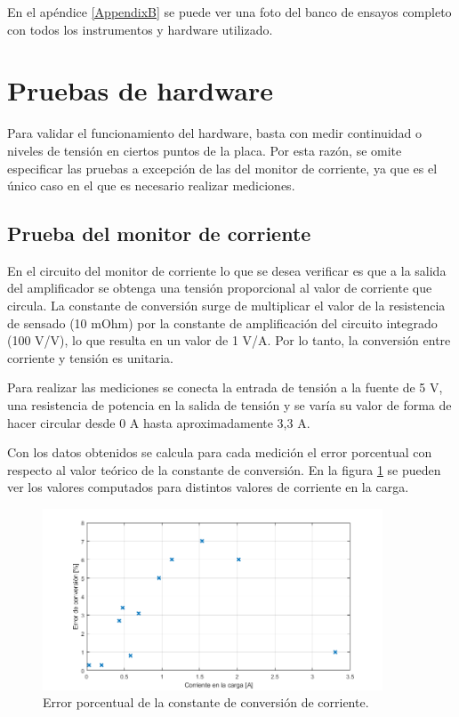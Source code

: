En el apéndice \ref{AppendixB} se puede ver una foto del banco de ensayos completo con todos los instrumentos y hardware utilizado.

\section{Pruebas de hardware}
\label{sec:pruebasHW}

Para validar el funcionamiento del hardware, basta con medir continuidad o niveles de tensión en ciertos puntos de la placa. Por esta razón, se omite especificar las pruebas a excepción de las del monitor de corriente, ya que es el único caso en el que es necesario realizar mediciones.

\subsection{Prueba del monitor de corriente}
\label{sec:monCorr}

En el circuito del monitor de corriente lo que se desea verificar es que a la salida del amplificador se obtenga una tensión proporcional al valor de corriente que circula. La constante de conversión surge de multiplicar el valor de la resistencia de sensado (10 mOhm) por la constante de amplificación del circuito integrado (100 V/V), lo que resulta en un valor de 1 V/A. Por lo tanto, la conversión entre corriente y tensión es unitaria.

Para realizar las mediciones se conecta la entrada de tensión a la fuente de 5 V, una resistencia de potencia en la salida de tensión y se varía su valor de forma de hacer circular desde 0 A hasta aproximadamente 3,3 A.


Con los datos obtenidos se calcula para cada medición el error porcentual con respecto al valor teórico de la constante de conversión. En la figura \ref{fig:testMonCorr} se pueden ver los valores computados para distintos valores de corriente en la carga.

\begin{figure}[H]
\centering
\includegraphics[width=0.9\textwidth]{./Figures/testMonCorr.png}
\caption{Error porcentual de la constante de conversión de corriente.}
\label{fig:testMonCorr}
\end{figure}

